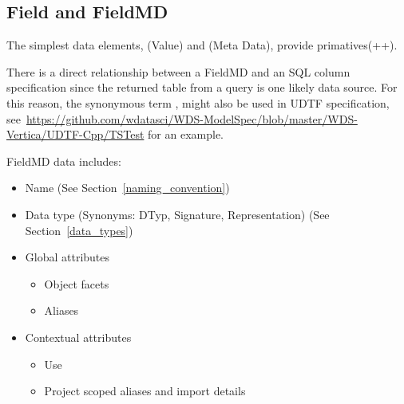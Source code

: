 \documentclass[10pt]{article}
\begin{document}
\subsection{Field and FieldMD\label{field}\label{fieldmd}}
    
    The simplest data elements,  (Value) and  (Meta Data), provide primatives(++).  

    There is a direct relationship between a FieldMD and an SQL column specification since the returned table from 
    a query is one likely data source.  For this reason, the synonymous term , might also be used in 
    UDTF specification, see~\url{https://github.com/wdatasci/WDS-ModelSpec/blob/master/WDS-Vertica/UDTF-Cpp/TSTest} for an example.

    FieldMD data includes:
                \begin{itemize}[label=-,noitemsep,topsep=0pt]
                    \item Name (See Section~\ref{naming_convention})
                    \item Data type (Synonyms: DTyp, Signature, Representation) (See Section~\ref{data_types})
                    \item Global attributes
                        \begin{itemize}[label=-,noitemsep,topsep=0pt]
                            \item Object facets
                            \item Aliases
                        \end{itemize}
                    \item Contextual attributes
                        \begin{itemize}[label=-,noitemsep,topsep=0pt]
                            \item Use
                            \item Project scoped aliases and import details
                        \end{itemize}
                \end{itemize}
\end{document}
